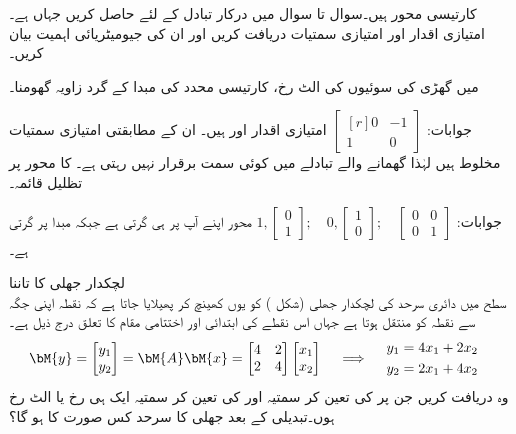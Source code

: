  کارتیسی محور ہیں۔سوال  تا سوال   میں درکار تبادل  کے لئے  حاصل کریں جہاں  ہے۔امتیازی اقدار اور امتیازی سمتیات دریافت کریں اور ان کی جیومیٹریائی اہمیت بیان کریں۔


 میں گھڑی کی سوئیوں کی الٹ رخ، کارتیسی محدد کی مبدا کے گرد   زاویہ گھومنا۔

جوابات:
$\begin{bmatrix*}[r] 0&-1\\1&0  \end{bmatrix*}$
امتیازی اقدار  اور   ہیں۔ ان کے مطابقتی امتیازی سمتیات مخلوط ہیں لہٰذا گھمانے والے تبادلے میں کوئی سمت برقرار نہیں رہتی ہے۔
 کا  محور پر تظلیل قائمہ۔

جوابات:
$1,\begin{bmatrix} 0\\1 \end{bmatrix}; \quad 0,\begin{bmatrix} 1\\0 \end{bmatrix};\quad \begin{bmatrix}0&0\\0&1  \end{bmatrix}$
محور  اپنے آپ پر ہی گرتی ہے جبکہ  مبدا پر گرتی ہے۔


\quad لچکدار جھلی کا تاننا\\
 سطح میں دائری سرحد  کی لچکدار جھلی (شکل ) کو یوں کھینچ کر پھیلایا جاتا ہے کہ نقطہ  اپنی جگہ سے  نقطہ   کو منتقل ہوتا ہے جہاں اس نقطے کی ابتدائی اور اختتامی  مقام کا تعلق درج ذیل ہے۔
\begin{gather*}
\bM{y}=\begin{bmatrix} y_1\\y_2 \end{bmatrix}=\bM{A}\bM{x}=\begin{bmatrix}4&2\\2&4  \end{bmatrix}\begin{bmatrix} x_1\\x_2 \end{bmatrix}\quad \implies \quad \begin{aligned}y_1&=4x_1+2x_2\\y_2&=2x_1+4x_2&  \end{aligned}
\end{gather*}
وہ  دریافت کریں جن پر  کی تعین کر سمتیہ اور  کی تعین کر سمتیہ ایک ہی رخ یا الٹ رخ ہوں۔تبدیلی کے بعد جھلی کا سرحد کس صورت کا ہو گا؟

